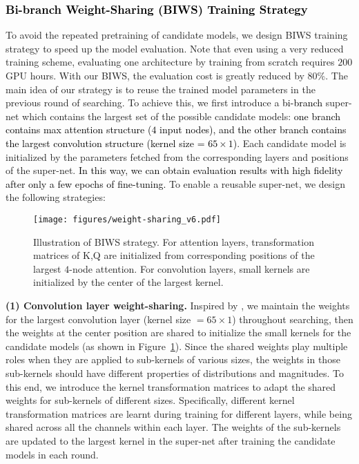 \documentclass[letterpaper]{article} \usepackage{aaai22}  \usepackage{times}  \usepackage{helvet}  \usepackage{courier}  \usepackage[hyphens]{url}  \usepackage{graphicx} \urlstyle{rm} \def\UrlFont{\rm}  \usepackage{natbib}  \usepackage{caption} \DeclareCaptionStyle{ruled}{labelfont=normalfont,labelsep=colon,strut=off} \frenchspacing  \setlength{\pdfpagewidth}{8.5in}  \setlength{\pdfpageheight}{11in}  \usepackage{algorithm}
\newcommand{\prj}[1]{\textcolor{black}{#1}} \newcommand{\prjj}[1]{\textcolor{black}{#1}} \newcommand{\jhh}[1]{\textcolor{black}{#1}} \newcommand{\jh}[1]{\textcolor{black}{#1}} \newcommand{\sh}[1]{\textcolor{black}{#1}} \usepackage{multirow}
\begin{document}
\subsubsection{
\prj{Bi-branch Weight-Sharing (BIWS) Training Strategy}
}

To avoid the repeated pretraining of candidate models, we
design BIWS training strategy to speed up the model evaluation. Note that
even using a very reduced training scheme, evaluating one architecture by
training from scratch requires $200$ GPU hours. With our BIWS, the evaluation cost is greatly reduced by 80\%. The main idea
of our strategy is to reuse the trained model parameters
in the previous round of searching. To achieve this, we first introduce a \jh{bi-branch}
super-net which contains the largest set of the possible candidate
models: \jh{one branch contains max attention structure ($4$ input nodes), and the other branch contains the largest convolution structure
(kernel size = $65\times1$)}. Each candidate model is initialized by the parameters fetched from the corresponding layers and positions of the super-net. \prj{In this way, we can obtain evaluation results with high fidelity after only a few epochs of fine-tuning.}
To enable a reusable super-net, we design the following strategies: 

\begin{figure}[h]
\centering
 	\vspace{-3mm}
	\texttt{[image: figures/weight-sharing\_v6.pdf]}
    \vspace{-5mm}
	\caption{Illustration of BIWS strategy. For attention layers, transformation matrices of K,Q are initialized from corresponding positions of the largest $4$-node attention. For convolution layers, small kernels are initialized by the center of the largest kernel.}
	\label{fig:weight-sharing}
	\vspace{-4mm}
\end{figure}

\textbf{(1) Convolution layer weight-sharing.} Inspired by \citep{cai2019once},  we maintain the weights for the largest convolution layer (kernel size $=65\times1$) throughout searching, then the weights at the center position are shared to initialize the small kernels for the candidate models (as shown in Figure~\ref{fig:weight-sharing}). Since the shared weights play multiple roles when they are applied to sub-kernels of various sizes, the weights in those sub-kernels should have different properties of distributions and magnitudes. To this end, we introduce the kernel transformation matrices to adapt the shared weights for sub-kernels of different sizes. 
{Specifically, different kernel transformation matrices are learnt during training for different layers, while being shared across all the channels within each layer.} 
The weights of the sub-kernels
are updated to the largest kernel in the super-net after training the candidate models in each round.
\end{document}
